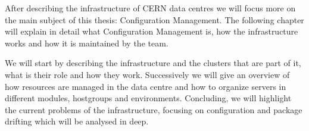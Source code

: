 
After describing the infrastructure of CERN data centres we will focus
more on the main subject of this thesis: Configuration Management. The
following chapter will explain in detail what Configuration Management is,
how the infrastructure works and how it is maintained by the team.

We will start by describing the infrastructure and the clusters that are
part of it, what is their role and how they work. Successively we will
give an overview of how resources are managed in the data centre and how
to organize servers in different modules, hostgroups and environments.
Concluding, we will highlight the current problems of the infrastructure,
focusing on configuration and package drifting which will be analysed in
deep.
